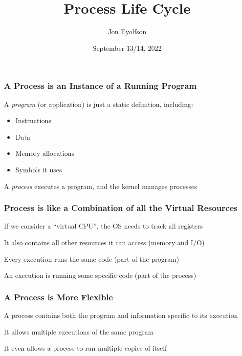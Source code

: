 

\title{Process Life Cycle}
\author{Jon Eyolfson}
\date{September 13/14, 2022}


  \begin{frame}
    \titlepage
  \end{frame}

  \begin{frame}
    \frametitle{A Process is an Instance of a Running Program}

    A \textit{program} (or application) is just a static definition, including:

    \begin{itemize}
      \item Instructions
      \item Data
      \item Memory allocations
      \item Symbols it uses
    \end{itemize}

    \vspace{2em}

    A \textit{process} executes a program, and the kernel manages processes
  \end{frame}

  \begin{frame}
    \frametitle{Process is like a Combination of all the Virtual Resources}

    If we consider a ``virtual CPU'', the OS needs to track all registers

    \vspace{2em}

    It also contains all other resources it can access (memory and I/O)

    \vspace{4em}

    Every execution runs the same code (part of the program)

    \hspace{2em} An execution is running some specific code (part of the
                 process)
  \end{frame}

  \begin{frame}
    \frametitle{A Process is More Flexible}

    A process contains both the program and information specific
    to its execution

    \vspace{4em}

    It allows multiple executions of the same program

    \vspace{2em}

    It even allows a process to run multiple copies of itself
  \end{frame}

